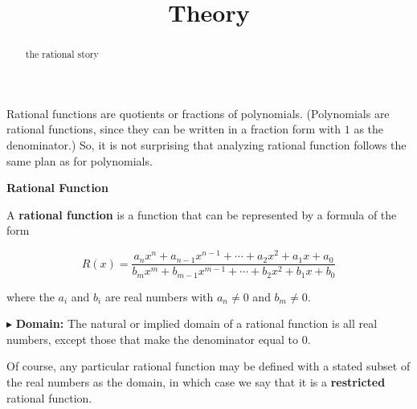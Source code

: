 \documentclass{ximera}
\title{Theory}
\begin{document}
\begin{abstract}
the rational story
\end{abstract}
\maketitle









Rational functions are quotients or fractions of polynomials.  (Polynomials are rational functions, since they can be written in a fraction form with $1$ as the denominator.)  So, it is not surprising that analyzing rational function follows the same plan as for polynomials.



















\begin{definition} \item \textbf{\textcolor{green!50!black}{Rational Function}}  


A \textbf{rational function} is a function that can be represented by a formula of the form


\[   R(x) = \frac{a_n x^n + a_{n-1} x^{n-1} + \cdots + a_2 x^2 + a_1 x + a_0}{b_m x^m + b_{m-1} x^{m-1} + \cdots + b_2 x^2 + b_1 x + b_0}        \]

where the $a_i$ and $b_i$ are real numbers with $a_n \ne 0$ and $b_m \ne 0$.


\end{definition}



$\blacktriangleright$ \textbf{\textcolor{red!10!blue!90!}{Domain:}}  The natural or implied domain of a rational function is all real numbers, except those that make the denominator equal to $0$.  



Of course, any particular rational function may be defined with a stated subset of the real numbers as the domain, in which case we  say that it is a \textbf{restricted} rational function.
\end{document}
